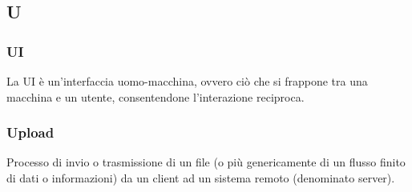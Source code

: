 \subsection*{\textbf{\hfill \Huge{U} \hfill}} 
\subsubsection*{UI}
La UI è un'interfaccia uomo-macchina, ovvero ciò che si frappone tra una macchina e un utente, consentendone l'interazione reciproca.

\subsubsection*{Upload}
Processo di invio o trasmissione di un file (o più genericamente di un flusso finito di dati o informazioni) da un client ad un sistema remoto (denominato server). 